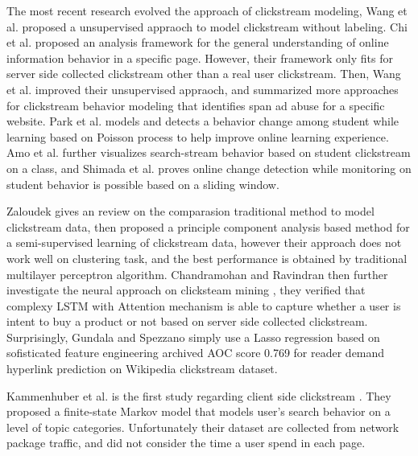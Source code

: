 The most recent research evolved the approach of clickstream modeling,
Wang et al.\cite{Wang:2016:UCC:2858036.2858107} proposed a unsupervised appraoch to model clickstream without labeling.
Chi et al. proposed an analysis framework \cite{chi2017towards} for the general understanding of online information behavior
in a specific page. However, their framework only fits for server side collected clickstream other than a real user clickstream.
Then, Wang et al. \cite{Wang:2017:CUB:3127338.3068332} improved their unsupervised appraoch,
and summarized more approaches for clickstream behavior modeling that identifies span ad abuse
for a specific website. Park et al. models and detects a behavior change among student while learning 
based on Poisson process \cite{Park:2017:DCS:3027385.3027430} to
help improve online learning experience. Amo et al. \cite{amo2018learning} further visualizes search-stream
behavior based on student clickstream on a class, and Shimada et al. proves \cite{Shimada:2018:OCD:3170358.3170412}
online change detection while monitoring on student behavior is possible based on a sliding window.

Zaloudek gives an review on the comparasion \cite{mastersthesis} traditional method to model clickstream data,
then proposed a principle component analysis based method for a semi-supervised learning
of clickstream data, however their approach does not work well on clustering task, and 
the best performance is obtained by traditional multilayer perceptron algorithm.
Chandramohan and Ravindran then further investigate the neural approach on clicksteam mining \cite{N:2018:NAB:3152494.3152505},
they verified that complexy LSTM with Attention mechanism is able to capture whether a user
is intent to buy a product or not based on server side collected clickstream.
Surprisingly, Gundala and Spezzano \cite{Gundala:2018:RDH:3184558.3191644} simply use a Lasso
regression based on sofisticated feature engineering 
archived AOC score 0.769 for reader demand hyperlink prediction on Wikipedia clickstream dataset.

Kammenhuber et al. is the first study regarding client side clickstream \cite{Kammenhuber:2006:WSC:1177080.1177110}.
They proposed a finite-state Markov model that models user's search behavior on a level of
topic categories. Unfortunately their dataset are collected from network package traffic,
and did not consider the time a user spend in each page.



